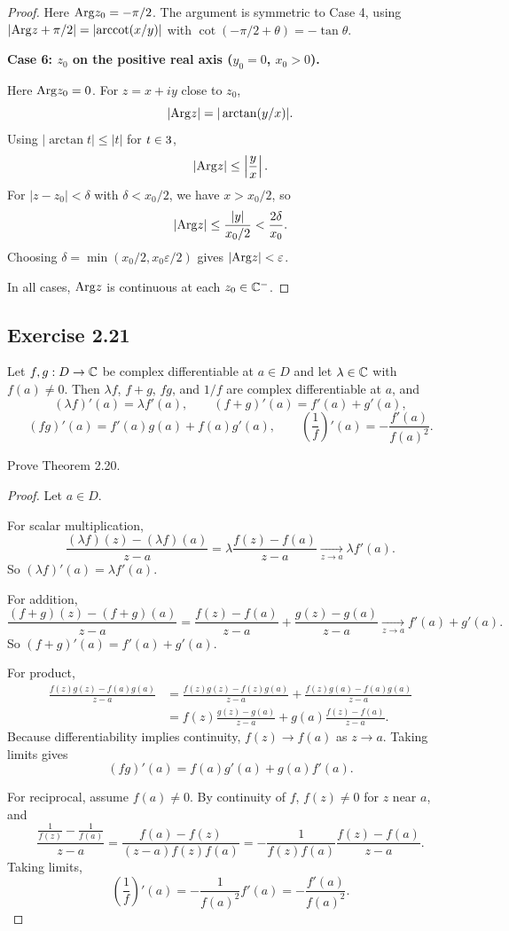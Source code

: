 \documentclass{article}
\begin{document}
\begin{proof}
  Here $\mathrm{Arg} z_0 = -\pi/2$. The argument is symmetric to Case 4, using
  $|\mathrm{Arg} z + \pi/2| = |\mathrm{arccot}(x/y)|$ with $\cot(-\pi/2 + \theta) =
  -\tan\theta$.

  \textbf{Case 6: $z_0$ on the positive real axis ($y_0 = 0$, $x_0 > 0$).}

  Here $\mathrm{Arg} z_0 = 0$. For $z = x + iy$ close to $z_0$,
  \[
    |\mathrm{Arg} z| = |\arctan(y/x)|.
  \]
  Using $|\arctan t| \le |t|$ for $t \in 3$,
  \[
    |\mathrm{Arg} z| \le \left|\frac{y}{x}\right|.
  \]
  For $|z - z_0| < \delta$ with $\delta < x_0/2$, we have $x > x_0/2$, so
  \[
    |\mathrm{Arg} z| \le \frac{|y|}{x_0/2} < \frac{2\delta}{x_0}.
  \]
  Choosing $\delta = \min(x_0/2, x_0\varepsilon/2)$ gives $|\mathrm{Arg} z| <
  \varepsilon$.

  In all cases, $\mathrm{Arg} z$ is continuous at each $z_0 \in \mathbb{C}^-$.
\end{proof}

\subsection{Exercise 2.21}

\begin{theorem}[Theorem 2.20]
  Let $f,g : D \to \mathbb{C}$ be complex differentiable at $a \in D$ and
  let $\lambda \in \mathbb{C}$ with $f(a) \ne 0$. Then
  $\lambda f$, $f+g$, $fg$, and $1/f$ are complex differentiable at $a$, and
  \[
    (\lambda f)'(a) = \lambda f'(a),
    \qquad
    (f+g)'(a) = f'(a) + g'(a),
  \]
  \[
    (fg)'(a) = f'(a)g(a) + f(a)g'(a),
    \qquad
    \left(\frac{1}{f}\right)'(a) = -\frac{f'(a)}{f(a)^2}.
  \]
\end{theorem}

Prove Theorem 2.20.

\begin{proof}
  Let $a\in D$.

  For scalar multiplication,
  \[
    \frac{(\lambda f)(z)-(\lambda f)(a)}{z-a}
    = \lambda\frac{f(z)-f(a)}{z-a}
    \xrightarrow[z\to a]{} \lambda f'(a).
  \]
  So $(\lambda f)'(a)=\lambda f'(a)$.

  For addition,
  \[
    \frac{(f+g)(z)-(f+g)(a)}{z-a}
    = \frac{f(z)-f(a)}{z-a} + \frac{g(z)-g(a)}{z-a}
    \xrightarrow[z\to a]{} f'(a)+g'(a).
  \]
  So $(f+g)'(a)=f'(a)+g'(a)$.

  For product,
  \[
    \begin{aligned}
      \frac{f(z)g(z)-f(a)g(a)}{z-a}
      &= \frac{f(z)g(z)-f(z)g(a)}{z-a}
      + \frac{f(z)g(a)-f(a)g(a)}{z-a} \\
      &= f(z)\frac{g(z)-g(a)}{z-a}
      + g(a)\frac{f(z)-f(a)}{z-a}.
    \end{aligned}
  \]
  Because differentiability implies continuity, $f(z)\to f(a)$ as
  $z\to a$. Taking limits gives
  \[
    (fg)'(a)=f(a)g'(a)+g(a)f'(a).
  \]

  For reciprocal, assume $f(a)\neq 0$. By continuity of $f$, $f(z)\neq 0$
  for $z$ near $a$, and
  \[
    \frac{\frac1{f(z)}-\frac1{f(a)}}{z-a}
    = \frac{f(a)-f(z)}{(z-a)f(z)f(a)}
    = -\frac{1}{f(z)f(a)}\frac{f(z)-f(a)}{z-a}.
  \]
  Taking limits,
  \[
    \left(\frac1f\right)'(a)
    = -\frac{1}{f(a)^2}f'(a)
    = -\frac{f'(a)}{f(a)^2}.
  \]
\end{proof}
\end{document}
